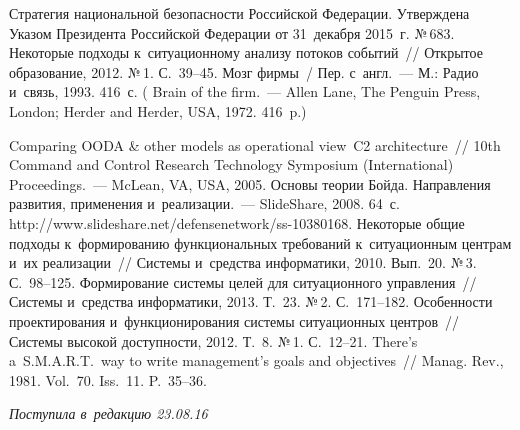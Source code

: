 \begin{multicols}{2}
{{\begin{thebibliography}{9}
Стратегия национальной безопасности Российской Федерации. Утверждена Указом 
Президента Российской Федерации от 31~декабря 2015~г. №\,683. 
 Некоторые подходы к~ситуационному анализу 
потоков событий~// Открытое образование, 2012. №\,1. С.~39--45.
 Мозг фирмы~/
Пер. с~англ.~--- М.: Радио и~связь, 1993. 416~с.
(  {Brain of the firm}.~--- Allen Lane, The Penguin Press, London; Herder 
and Herder, USA, 1972. 416~p.)

 Comparing OODA \& other models as operational view~C2 
architecture~// 10th Command and Control Research Technology Symposium (International) 
Proceedings.~--- McLean, VA, USA, 2005.
 Основы теории Бойда. Направления развития, применения 
и~реализации.~--- SlideShare, 2008. 64~с. {\sf  
http://www.slideshare.net/defensenetwork/ss-10380168}.
 Некоторые общие подходы 
к~формированию функциональных требований к~ситуационным центрам и~их 
реализации~// Системы и~средства информатики, 2010. Вып.~20. №\,3. С.~98--125.
 Формирование сис\-те\-мы целей для ситуационного управ\-ле\-ния~// 
Сис\-те\-мы и~средства информатики, 2013. Т.~23. №\,2. С.~171--182.
 Особенности проектирования 
и~функционирования сис\-те\-мы ситуационных центров~// Системы высокой доступности, 
2012. Т.~8. №\,1. С.~12--21.
 There's a~S.M.A.R.T.\ way to write management's goals and objectives~// 
Manag. Rev., 1981. Vol.~70. Iss.~11. P.~35--36.
 \end{thebibliography}

 }
 }

\end{multicols}

\vspace*{-6pt}

\hfill{\small\textit{Поступила в~редакцию 23.08.16}}


\newpage

\vspace*{-24pt}




